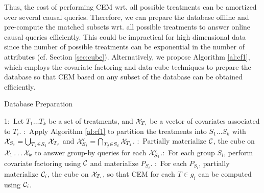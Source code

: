 Thus, the cost of performing CEM wrt. all possible treatments can be amortized over several causal queries. Therefore, we can prepare the database offline and pre-compute the matched subsets wrt. all
possible treatments to answer online causal queries efficiently. This could be impractical for high dimensional data since the number of possible treatments can be exponential in the number of attributes (cf. Section \ref{sec:cube}). Alternatively, we propose
Algorithm \ref{al:cf1}, which employs the covariate factoring and data-cube techniques to prepare the database so that CEM based on
any subset of the database can be obtained efficiently.


\vspace{-0.2cm}
\begin{algorithm} 
\caption{Database Preparation} \label{alg:dp}
1:\   Let $T_1 \ldots T_k$ be a set of treatments, and  ${{\mathcal{X}}}_{T_i}$ be a vector of covariates associated to $T_i$.   :\ Apply  Algorithm \ref{al:cf1} to partition the treatments into $S_1 \ldots S_k$ with ${{\mathcal{X}}}_{S_i}= \bigcup_{T_j \in S_i} {{\mathcal{X}}}_{T_j}$
and $\mathcal{X}'_{S_i}= \bigcap_{T_j \in S_i} {{\mathcal{X}}}_{T_j} $. :\ Partially materialize $\mathcal{C}$, the cube  on ${{\mathcal{X}}}_1 \ldots {{\mathcal{X}}}_k$ to answer group-by queries for each $\mathcal{X}'_{S_i}$.:\ For each group $S_i$, perform covariate factoring using $\mathcal{C}$ and materialize $P_{S_i}$. :\ For each $P_{S_i}$, partially materialize $\mathcal{C}_i$, the cube on ${{\mathcal{X}}}_{T_i}$, so that CEM for each $T \in g_i$ can be computed using $\mathcal{C}_i$.
\end{algorithm}







